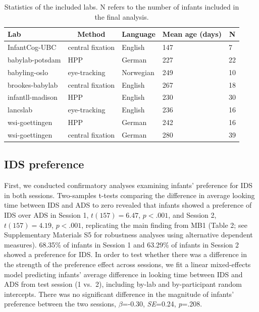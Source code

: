 \documentclass[
  man,floatsintext]{apa6}
\begin{document}
\begin{table}[tbp]

\begin{center}
\begin{threeparttable}

\caption{\label{tab:labs}Statistics of the included labs. N refers to the number of infants included in the final analysis.}

\begin{tabular}{lllll}
\toprule
Lab & \multicolumn{1}{c}{Method} & \multicolumn{1}{c}{Language} & \multicolumn{1}{c}{Mean age (days)} & \multicolumn{1}{c}{N}\\
\midrule
InfantCog-UBC & central fixation & English & 147 & 7\\
babylab-potsdam & HPP & German & 227 & 22\\
babyling-oslo & eye-tracking & Norwegian & 249 & 10\\
brookes-babylab & central fixation & English & 267 & 18\\
infantll-madison & HPP & English & 230 & 30\\
lancslab & eye-tracking & English & 236 & 16\\
wsi-goettingen & HPP & German & 242 & 16\\
wsi-goettingen & central fixation & German & 280 & 39\\
\bottomrule
\end{tabular}

\end{threeparttable}
\end{center}

\end{table}

\hypertarget{ids-preference}{%
\subsection{IDS preference}\label{ids-preference}}

First, we conducted confirmatory analyses examining infants' preference for IDS in both sessions. Two-samples t-tests comparing the difference in average looking time between IDS and ADS to zero revealed that infants showed a preference of IDS over ADS in Session 1, \(t(157) = 6.47\), \(p < .001\), and Session 2, \(t(157) = 4.19\), \(p < .001\), replicating the main finding from MB1 (Table 2; see Supplementary Materials S5 for robustness analyses using alternative dependent measures).
68.35\% of infants in Session 1 and 63.29\% of infants in Session 2 showed a preference for IDS.
In order to test whether there was a difference in the strength of the preference effect across sessions, we fit a linear mixed-effects model predicting infants' average difference in looking time between IDS and ADS from test session (1 vs.~2), including by-lab and by-participant random intercepts.
There was no significant difference in the magnitude of infants' preference between the two sessions, \(\beta\)=-0.30, \emph{SE}=0.24, \emph{p}=.208.
\end{document}
